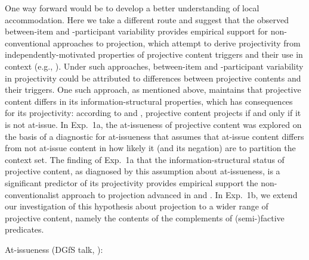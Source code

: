 \documentclass[11pt,fleqn]{article}
\newcommand{\6}{\mbox{$[\hspace*{-.6mm}[$}}
\newcommand{\9}{\mbox{$]\hspace*{-.6mm}]$}}
\begin{document}
One way forward would be to develop a better understanding of local accommodation. Here we take a different route and suggest that the observed between-item and -participant variability provides empirical support for non-conventional approaches to projection, which attempt to derive projectivity from independently-motivated properties of projective content triggers and their use in context (e.g., \citealt{stalnaker74,kempson75,wilson75,boer-lycan76,levinson83,kadmon01,simons01,simons04,atlas05,abusch10,abrusan2011,best-question}). Under such approaches, between-item and -participant variability in projectivity could be attributed to differences between projective contents and their triggers. One such approach, as mentioned above, maintains that projective content differs in its information-structural properties, which has consequences for its projectivity: according to \citealt{brst-salt10} and \citealt{brst-ar}, projective content projects if and only if it is not at-issue. In Exp.~1a, the at-issueness of projective content was explored on the basis of a diagnostic for at-issueness that assumes that at-issue content differs from not at-issue content in how likely it (and its negation) are to partition the context set. The finding of Exp.~1a that the information-structural status of projective content, as diagnosed by this assumption about at-issueness, is a significant predictor of its projectivity provides empirical support the non-conventionalist approach to projection advanced in \citealt{brst-salt10} and \citealt{brst-ar}. In Exp.~1b, we extend our investigation of this hypothesis about projection to a wider range of projective content, namely the contents of the complements of (semi-)factive predicates.


At-issueness (DGfS talk, \citealt{tonhauser-dgfs2017}):
\end{document}

